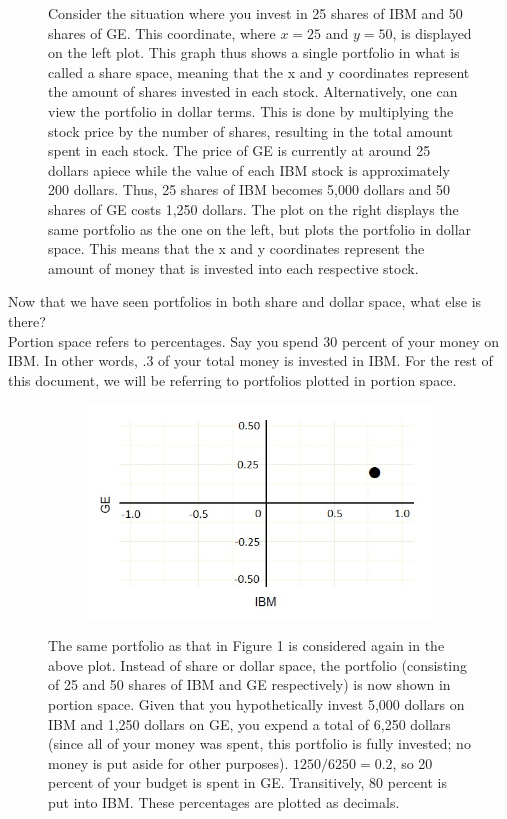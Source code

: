 \documentclass{article}\usepackage{graphicx, color}
\begin{document}
\begin{figure}[H]
\begin{subfigure}[b]{0.5\textwidth}
      \label{fig:dollarspace}
      \end{subfigure}
\caption{Consider the situation where you invest in 25 shares of IBM and 50 shares of GE. This coordinate, where $x = 25$ and $y = 50$, is displayed on the left plot. This graph thus shows a single portfolio in what is called a share space, meaning that the x and y coordinates represent the amount of shares invested in each stock. Alternatively, one can view the portfolio in dollar terms. This is done by multiplying the stock price by the number of shares, resulting in the total amount spent in each stock. The price of GE is currently at around 25 dollars apiece while the value of each IBM stock is approximately 200 dollars. Thus, 25 shares of IBM becomes 5,000 dollars and 50 shares of GE costs 1,250 dollars. The plot on the right displays the same portfolio as the one on the left, but plots the portfolio in dollar space. This means that the x and y coordinates represent the amount of money that is invested into each respective stock.}
\end{figure}

Now that we have seen portfolios in both share and dollar space, what else is there?
\\
Portion space refers to percentages. Say you spend 30 percent of your money on IBM. In other words, .3 of your total money is invested in IBM. For the rest of this document, we will be referring to portfolios plotted in portion space.

\begin{figure}[H]
  \begin{subfigure}[b]{1.0\textwidth}
    \centering
    \includegraphics[width=\textwidth]{portionspace}
    \label{fig:portionspace}
  \end{subfigure}
\caption{The same portfolio as that in Figure 1 is considered again in the above plot. Instead of share or dollar space, the portfolio (consisting of 25 and 50 shares of IBM and GE respectively) is now shown in portion space. Given that you hypothetically invest 5,000 dollars on IBM and 1,250 dollars on GE, you expend a total of 6,250 dollars (since all of your money was spent, this portfolio is fully invested; no money is put aside for other purposes). $1250/6250 = 0.2$, so 20 percent of your budget is spent in GE. Transitively, 80 percent is put into IBM. These percentages are plotted as decimals.}
\end{figure}
\end{document}
